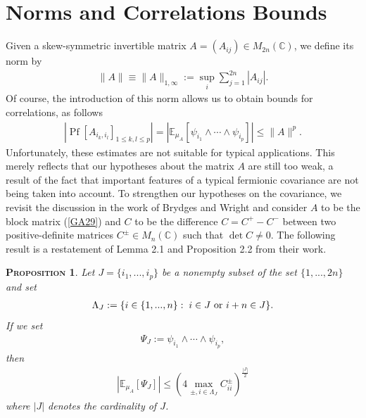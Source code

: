 \documentclass[12pt,twoside]{amsart}
\newcommand{\E}{{\mathbb{E}}}
\newtheorem{prop}{\textsc{Proposition}} [section]
\numberwithin{equation}{section}
\begin{document}
 
\section{Norms and Correlations Bounds}\label{norms}

Given a skew-symmetric invertible matrix $A = (A_{ij}) \in M_{2n}(\mathbb{C})$, we define its norm by
\begin{eqnarray}
\|A\| \equiv \|A\|_{1,\infty} := \sup_{i}\sum_{j=1}^{2n}|A_{ij}|. \label{NOR1}
\end{eqnarray}
Of course, the introduction of this norm allows us to obtain bounds for correlations, as follows
\begin{eqnarray}
|\operatorname{Pf}[A_{i_{k},i_{l}}]_{1\le k,l \le p}| = |\E_{\mu_{A}}[\psi_{i_{1}}\wedge \cdots \wedge \psi_{i_{p}}]|  \le \|A\|^{p}. \label{NOR2}
\end{eqnarray} 
Unfortunately, these estimates are not suitable for typical applications. This merely reflects that our hypotheses about the matrix $A$ are still too weak, a result of the fact that important features of a typical fermionic covariance are not being taken into account. To strengthen our hypotheses on the covariance, we revisit the discussion in the work of Brydges and Wright \cite{BryWri} and consider $A$ to be the block matrix (\ref{GA29}) and $C$ to be the difference $C = C^{+} - C^{-}$ between two positive-definite matrices $C^{\pm} \in M_{n}(\mathbb{C})$ such that $\det C \neq 0$. The following result is a restatement of Lemma 2.1 and Proposition 2.2 from their work.

\begin{prop}\label{estimatescorrelations} Let $J = \{i_{1},...,i_{p}\}$ be a nonempty subset of the set $\{1,...,2n\}$ and set
\begin{eqnarray}
\Lambda_{J} := \{i \in \{1,...,n\}: \hspace{0.1cm} \mbox{$i \in J$ or $i + n \in J$}\}. \label{NOR3}
\end{eqnarray}
If we set
\begin{eqnarray}
\Psi_{J} := \psi_{i_{1}}\wedge \cdots \wedge \psi_{i_{p}}, \label{NOR4}
\end{eqnarray}
then
\begin{eqnarray}
|\E_{\mu_{A}}[\Psi_{J}]| \le (4\max_{\pm, i \in \Lambda_{J}}C^{\pm}_{ii})^{\frac{|J|}{2}} \label{NOR5}
\end{eqnarray}
where $|J|$ denotes the cardinality of $J$. 
\end{prop}
\end{document}
